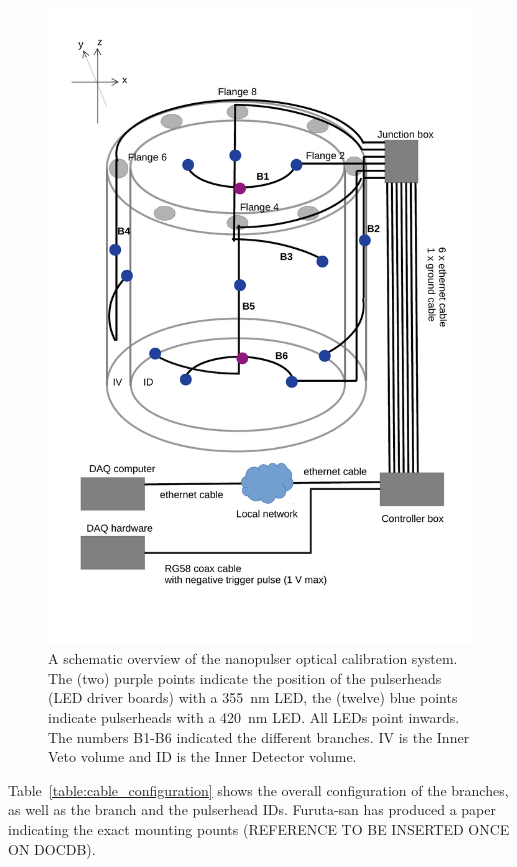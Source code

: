 \begin{figure}
\begin{center}	
  \includegraphics[width=0.75\linewidth]{figures/JSNS2_led_system_overview.pdf}
  \caption{A schematic overview of the nanopulser optical calibration system. The (two) purple points indicate the position of the pulserheads (LED driver boards) with a 355~nm LED, the (twelve) blue points indicate pulserheads with a 420~nm LED. All LEDs point inwards. The numbers B1-B6 indicated the different branches. IV is the Inner Veto volume and ID is the Inner Detector volume.}
  \label{figure:controlbox}
\end{center}
\end{figure}

Table~\ref{table:cable_configuration} shows the overall configuration of the branches, as well as the branch and the pulserhead IDs. Furuta-san has produced a paper indicating the exact mounting pounts (REFERENCE TO BE INSERTED ONCE ON DOCDB).

